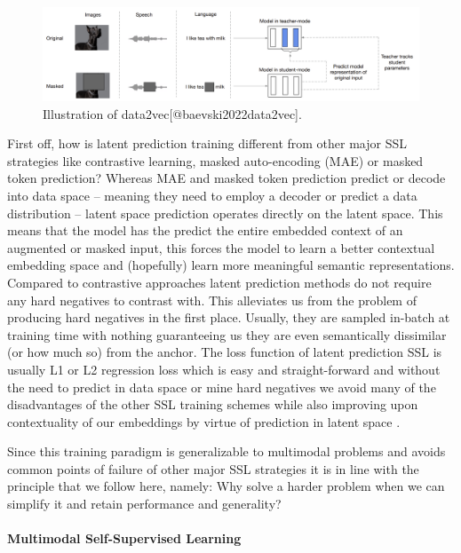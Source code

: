 \documentclass[
]{krantz}
\begin{document}
\begin{figure}

{\centering \includegraphics[width=1\linewidth]{figures/03-01/data2vec} 

}

\caption{Illustration of data2vec[@baevski2022data2vec].}\label{fig:data2vec}
\end{figure}

First off, how is latent prediction training different from other major SSL strategies like contrastive learning, masked auto-encoding (MAE) or masked token prediction? Whereas MAE and masked token prediction predict or decode into data space -- meaning they need to employ a decoder or predict a data distribution -- latent space prediction operates directly on the latent space. This means that the model has the predict the entire embedded context of an augmented or masked input, this forces the model to learn a better contextual embedding space and (hopefully) learn more meaningful semantic representations. Compared to contrastive approaches latent prediction methods do not require any hard negatives to contrast with. This alleviates us from the problem of producing hard negatives in the first place. Usually, they are sampled in-batch at training time with nothing guaranteeing us they are even semantically dissimilar (or how much so) from the anchor. The loss function of latent prediction SSL is usually L1 or L2 regression loss which is easy and straight-forward and without the need to predict in data space or mine hard negatives we avoid many of the disadvantages of the other SSL training schemes while also improving upon contextuality of our embeddings by virtue of prediction in latent space \citep{baevski2022data2vec}.

Since this training paradigm is generalizable to multimodal problems and avoids common points of failure of other major SSL strategies it is in line with the principle that we follow here, namely: Why solve a harder problem when we can simplify it and retain performance and generality?

\hypertarget{multimodal-self-supervised-learning}{%
\paragraph{Multimodal Self-Supervised Learning}\label{multimodal-self-supervised-learning}}
\end{document}
